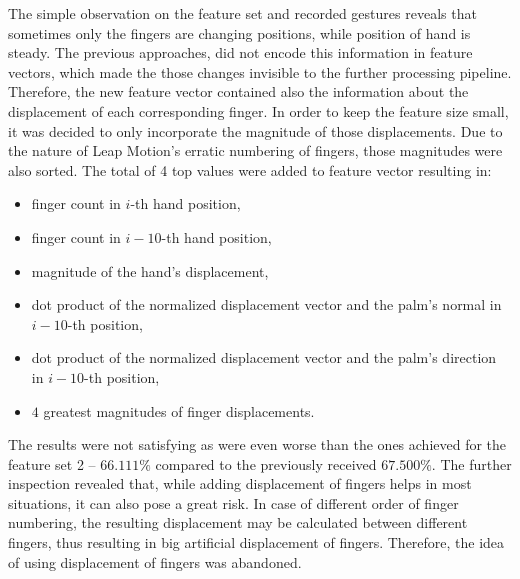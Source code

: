 The simple observation on the feature set and recorded gestures reveals that sometimes only the fingers are changing positions, while position of hand is steady.
The previous approaches, did not encode this information in feature vectors, which made the those changes invisible to the further processing pipeline.
Therefore, the new feature vector contained also the information about the displacement of each corresponding finger.
In order to keep the feature size small, it was decided to only incorporate the magnitude of those displacements. 
Due to the nature of Leap Motion's erratic numbering of fingers, those magnitudes were also sorted.
The total of 4 top values were added to feature vector resulting in:
\begin{itemize}
\item finger count in $i$-th hand position,
\item finger count in $i-10$-th hand position,
\item magnitude of the hand's displacement,
\item dot product of the normalized displacement vector and the palm's normal in $i-10$-th position,
\item dot product of the normalized displacement vector and the palm's direction in $i-10$-th position,
\item $4$ greatest magnitudes of finger displacements.
\end{itemize}
The results were not satisfying as were even worse than the ones achieved for the feature set 2 -- $66.111\%$ compared to the previously received $67.500\%$. 
The further inspection revealed that, while adding displacement of fingers helps in most situations, it can also pose a great risk.
In case of different order of finger numbering, the resulting displacement may be calculated between different fingers, thus resulting in big artificial displacement of fingers.
Therefore, the idea of using displacement of fingers was abandoned.
 
